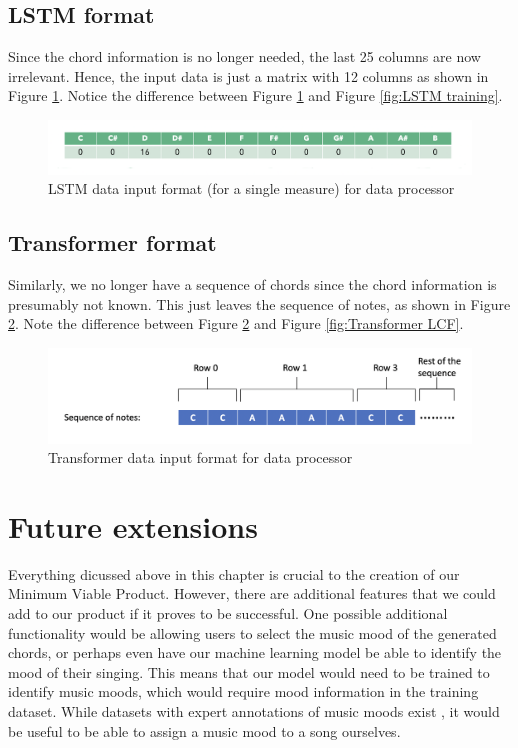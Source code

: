   \subsection{LSTM format}
Since the chord information is no longer needed, the last 25 columns are now irrelevant. Hence, the input data is just a matrix with 12 columns as shown in Figure \ref{fig:LSTM data processor}. Notice the difference between Figure \ref{fig:LSTM data processor} and Figure \ref{fig:LSTM training}.

\begin{figure}
    \centering
    \includegraphics[scale=0.3]{Figures/LSTM data processor}
    \decoRule
    \caption{LSTM data input format (for a single measure) for data processor}
    \label{fig:LSTM data processor}
    \end{figure}

\subsection{Transformer format}
Similarly, we no longer have a sequence of chords since the chord information is presumably not known. This just leaves the sequence of notes, as shown in Figure \ref{fig:Transformer data processor}. Note the difference between Figure \ref{fig:Transformer data processor} and Figure \ref{fig:Transformer LCF}.

\begin{figure}
    \centering
    \includegraphics[scale=0.3]{Figures/Transformer data processor}
    \decoRule
    \caption{Transformer data input format for data processor}
    \label{fig:Transformer data processor}
    \end{figure}

\section{Future extensions}
Everything dicussed above in this chapter is crucial to the creation of our Minimum Viable Product. However, there are additional features that we could add to our product if it proves to be successful. One possible additional functionality would be allowing users to select the music mood of the generated chords, or perhaps even have our machine learning model be able to identify the mood of their singing. This means that our model would need to be trained to identify music moods, which would require mood information in the training dataset. While datasets with expert annotations of music moods exist \cite{allmusic}, it would be useful to be able to assign a music mood to a song ourselves.

